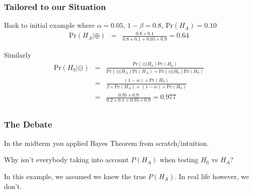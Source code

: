 \documentclass[handout]{beamer}
\newcommand{\blue}[1]{\textcolor{blue2}{#1}}
\newcommand{\prob}{\mbox{Pr}}
\newcommand{\cp}{\oplus}
\newcommand{\cm}{\circleddash}
\begin{document}
\begin{frame}[fragile]
\frametitle{Tailored to our Situation}

%
%
Back to initial example where $\alpha=0.05$, $1-\beta=0.8$, $\prob(H_A)=0.10$
\pause
\begin{eqnarray*}
\prob(H_A|\cp) &=& \frac{0.8 \times 0.1}{0.8 \times 0.1 + 0.05\times 0.9} = 0.64
\end{eqnarray*}

\pause Similarly
\begin{eqnarray*}
\prob(H_0|\cm) &=& \frac{\prob(\cm|H_0)\prob(H_0)}{\prob(\cm|H_A)\prob(H_A) + \prob(\cm|H_0)\prob(H_0)} \\
&=& \frac{(1-\alpha)\times\prob(H_0)}{
\beta\times\prob(H_A) + (1-\alpha)\times\prob(H_0)}\\
&=& \frac{0.95 \times 0.9}{0.2\times 0.1 + 0.95 \times 0.9} = 0.977\\
\end{eqnarray*}

\end{frame}



\begin{frame}[fragile]
\frametitle{The Debate}

In the midterm you applied Bayes Theorem from scratch/intuition.
\pause
\vspace{0.5cm}

Why isn't everybody taking into account $P(H_A)$ when testing $H_0$ vs $H_A$?
\pause
\vspace{0.5cm}

In this example, we assumed we \blue{knew} the true $P(H_A)$.  In real life however, we don't.


\end{frame}
\end{document}
